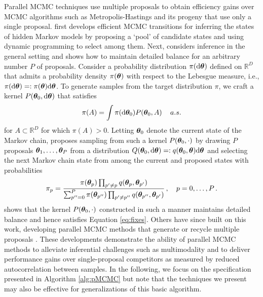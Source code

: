 \documentclass[12pt]{article} %
\begin{document}
Parallel MCMC techniques use multiple proposals to obtain efficiency gains over MCMC algorithms such as Metropolis-Hastings \citep{metropolis1953equation,hastings1970monte} and its progeny that use only a single proposal.  \citet{neal2003markov} first develops efficient MCMC transitions for inferring the states of hidden Markov models by proposing a `pool' of candidate states and using dynamic programming to select among them. Next, \citet{tjelmeland2004using} considers inference in the general setting and shows how to maintain detailed balance for an arbitrary number $P$ of proposals.  Consider a probability distribution $\pi(\mbox{d}\boldsymbol{\theta})$ defined on $\mathbb{R}^D$ that admits a probability density $\pi(\boldsymbol{\theta})$ with respect to the Lebesgue measure, i.e., $\pi(\mbox{d} \boldsymbol{\theta})=:\pi(\boldsymbol{\theta})\mbox{d}\boldsymbol{\theta}$. To generate samples from the target distribution $\pi$, we craft a kernel $P(\boldsymbol{\theta}_0,\mbox{d} \boldsymbol{\theta})$ that satisfies
\begin{align}\label{eq:fixes}
\pi(A) = \int \pi(\mbox{d} \boldsymbol{\theta}_0) P(\boldsymbol{\theta}_0,A) \, \quad a.s.
\end{align} 
for  $A \subset \mathbb{R}^D$ for which $\pi(A) > 0$.  Letting $\boldsymbol{\theta}_0$ denote the current state of the Markov chain, \citet{tjelmeland2004using} proposes sampling from such a kernel $P(\boldsymbol{\theta}_0,\cdot)$ by drawing $P$ proposals $\boldsymbol{\theta}_1,\dots,\boldsymbol{\theta}_P$ from a distribution $Q(\boldsymbol{\theta}_0,\mbox{d} \boldsymbol{\theta}) =: q(\boldsymbol{\theta}_0,\boldsymbol{\theta})\mbox{d} \boldsymbol{\theta}$ and selecting the next Markov chain state from among the current and proposed states with probabilities
\begin{align}\label{eq:probs}
\pi_p = \frac{\pi(\boldsymbol{\theta}_p) \prod_{p' \neq p} q(\boldsymbol{\theta}_p,\boldsymbol{\theta}_{p'})}{\sum_{p''=0}^P \pi(\boldsymbol{\theta}_{p''}) \prod_{p' \neq p''} q(\boldsymbol{\theta}_{p''},\boldsymbol{\theta}_{p'})} \, , \quad p=0,\dots,P \, .
\end{align}
\citet{tjelmeland2004using} shows that the kernel $P(\boldsymbol{\theta}_0,\cdot)$ constructed in such a manner maintains detailed balance and hence satisfies Equation \eqref{eq:fixes}.  Others have since built on this work, developing parallel MCMC methods that generate or recycle multiple proposals \citep{frenkel2004speed,delmas2009does,calderhead2014general,yang2018parallelizable,luo2019multiple,schwedes2021rao,holbrook2021generating}.  
These developments demonstrate the ability of parallel MCMC methods to alleviate inferential challenges such as multimodality and to deliver performance gains over single-proposal competitors as measured by reduced autocorrelation between samples.  In the following, we focus on the specification presented in Algorithm \ref{alg:pMCMC} but note that the techniques we present may also be effective for generalizations of this basic algorithm.
\end{document}
